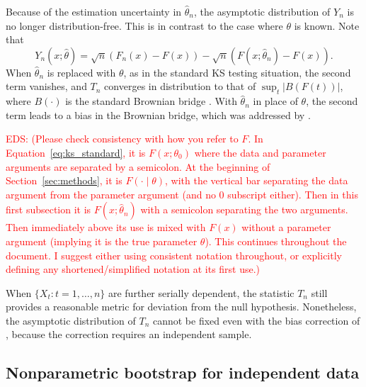 \documentclass[APA,Times1COL]{WileyNJDv5} %
\newcommand{\eds}[1]{\textcolor{red}{EDS: (#1)}}
\begin{document}
Because of the estimation uncertainty in $\hat\theta_n$, the asymptotic
distribution of $Y_n$ is no longer distribution-free. This is in contrast to the
case where $\theta$ is known.  Note that
\begin{equation*}
Y_n(x; \hat\theta) = \sqrt{n}(F_n(x) - F(x)) - 
\sqrt{n}(F(x; \hat\theta_n) - F(x)).
\end{equation*}
When $\hat\theta_n$ is replaced with $\theta$, as in the standard KS testing
situation, the second term vanishes, and $T_n$ converges in distribution to that
of $\sup_t | B(F(t)) |$, where $B(\cdot)$ is the standard Brownian bridge
\citep{kolmogorov1933sulla}. With $\hat\theta_n$ in place of $\theta$, the
second term leads to a bias in the Brownian bridge, which was addressed by
\citet{babu2004goodness}.

\eds{Please check consistency with how you refer to $F$.  In 
Equation~\eqref{eq:ks_standard}, it is $F(x; \theta_0)$ where the data and 
parameter arguments are separated by a semicolon.  At the beginning of 
Section~\ref{sec:methods}, it is $F(\cdot \mid \theta)$, with the vertical bar
separating the data argument from the parameter argument (and no 0 subscript
either).   Then in this first 
subsection it is $F(x; \hat\theta_n)$ with a semicolon separating the two 
arguments.  Then immediately above its use is mixed with $F(x)$ without a 
parameter argument (implying it is the true parameter $\theta$). This continues
throughout the document. I suggest either using consistent notation throughout, 
or explicitly defining any shortened/simplified notation at its first use.}

When $\{X_t: t = 1, \ldots, n\}$ are further serially dependent, the statistic
$T_n$ still provides a reasonable metric for deviation from the null
hypothesis. Nonetheless, the asymptotic distribution of $T_n$ cannot be fixed
even with the bias correction of \citet{babu2004goodness}, because the
correction requires an independent sample.

\subsection{Nonparametric bootstrap for independent data}
\end{document}

